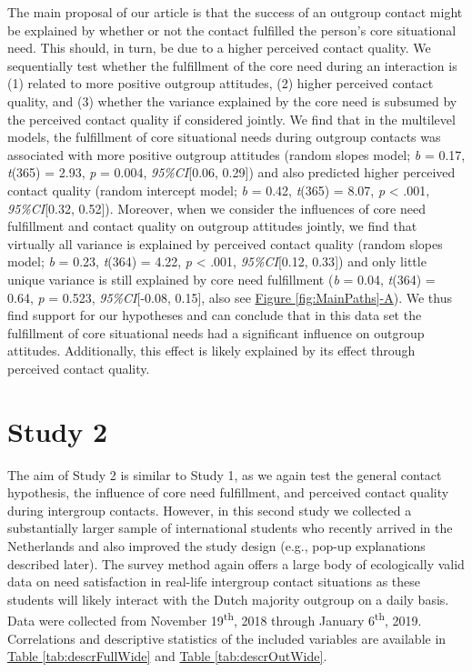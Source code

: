 \documentclass[man, 12pt, a4paper, mask]{apa7}
\theoremstyle{break}
\theoremstyle{plain}
\newcommand{\fgrref}[2][]{\hyperref[#2]{Figure \ref*{#2}#1}}
\newcommand{\tblref}[2][]{\hyperref[#2]{Table \ref*{#2}#1}}
\begin{document}
The main proposal of our article is that the success of an outgroup
contact might be explained by whether or not the contact fulfilled the
person's core situational need. This should, in turn, be due to a higher
perceived contact quality. We sequentially test whether the fulfillment
of the core need during an interaction is (1) related to more positive
outgroup attitudes, (2) higher perceived contact quality, and (3)
whether the variance explained by the core need is subsumed by the
perceived contact quality if considered jointly. We find that in the
multilevel models, the fulfillment of core situational needs during
outgroup contacts was associated with more positive outgroup attitudes
(random slopes model; \textit{b} = 0.17, \textit{t}(365) = 2.93,
\textit{p} = 0.004, \textit{95\%CI}{[}0.06, 0.29{]}) and also predicted
higher perceived contact quality (random intercept model; \textit{b} =
0.42, \textit{t}(365) = 8.07, \textit{p} \textless{} .001,
\textit{95\%CI}{[}0.32, 0.52{]}). Moreover, when we consider the
influences of core need fulfillment and contact quality on outgroup
attitudes jointly, we find that virtually all variance is explained by
perceived contact quality (random slopes model; \textit{b} = 0.23,
\textit{t}(364) = 4.22, \textit{p} \textless{} .001,
\textit{95\%CI}{[}0.12, 0.33{]}) and only little unique variance is
still explained by core need fulfillment (\textit{b} = 0.04,
\textit{t}(364) = 0.64, \textit{p} = 0.523, \textit{95\%CI}{[}-0.08,
0.15{]}, also see \fgrref[-A]{fig:MainPaths}). We thus find support for
our hypotheses and can conclude that in this data set the fulfillment of
core situational needs had a significant influence on outgroup
attitudes. Additionally, this effect is likely explained by its effect
through perceived contact quality.

\section{Study 2}

The aim of Study 2 is similar to Study 1, as we again test the general
contact hypothesis, the influence of core need fulfillment, and
perceived contact quality during intergroup contacts. However, in this
second study we collected a substantially larger sample of international
students who recently arrived in the Netherlands and also improved the
study design (e.g., pop-up explanations described later). The survey
method again offers a large body of ecologically valid data on need
satisfaction in real-life intergroup contact situations as these
students will likely interact with the Dutch majority outgroup on a
daily basis. Data were collected from November 19\textsuperscript{th},
2018 through January 6\textsuperscript{th}, 2019. Correlations and
descriptive statistics of the included variables are available in
\tblref{tab:descrFullWide} and \tblref{tab:descrOutWide}.
\end{document}
